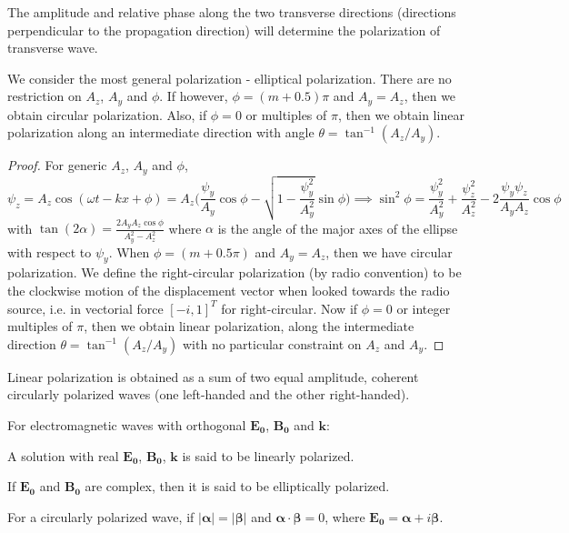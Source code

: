 \documentclass[a4paper]{article}
\begin{document}
\begin{defi}
The amplitude and relative phase along the two transverse directions (directions perpendicular to the propagation direction) will determine the polarization of transverse wave. 
\end{defi}
\begin{thm}
We consider the most general polarization - elliptical polarization. There are no restriction on $A_z$, $A_y$ and $\phi$. If however, $\phi=(m+0.5)\pi$ and $A_y=A_z$, then we obtain circular polarization. Also, if $\phi=0$ or multiples of $\pi$, then we obtain linear polarization along an intermediate direction with angle $\theta=\tan^{-1}(A_z/A_y)$.
\end{thm}
\begin{proof}
For generic $A_z$, $A_y$ and $\phi$,
$$\psi_z=A_z\cos(\omega t-kx+\phi)=A_z\bigg(\frac{\psi_y}{A_y}\cos\phi-\sqrt{1-\frac{\psi_y^2}{A_y^2}}\sin\phi\bigg)\implies\sin^2\phi=\frac{\psi_y^2}{A_y^2}+\frac{\psi_z^2}{A_z^2}-2\frac{\psi_y\psi_z}{A_yA_z}\cos\phi$$
with $\tan(2\alpha)=\frac{2A_yA_z\cos\phi}{A_y^2-A_z^2}$ where $\alpha$ is the angle of the major axes of the ellipse with respect to $\psi_y$. When $\phi=(m+0.5\pi)$ and $A_y=A_z$, then we have circular polarization. We define the right-circular polarization (by radio convention) to be the clockwise motion of the displacement vector when looked towards the radio source, i.e. in vectorial force $[-i,1]^T$ for right-circular. Now if $\phi=0$ or integer multiples of $\pi$, then we obtain linear polarization, along the intermediate direction $\theta=\tan^{-1}(A_z/A_y)$ with no particular constraint on $A_z$ and $A_y$.
\end{proof}
\begin{cor}
Linear polarization is obtained as a sum of two equal amplitude, coherent circularly polarized waves (one left-handed and the other right-handed).
\end{cor}
For electromagnetic waves with orthogonal $\mathbf{E_0}$, $\mathbf{B_0}$ and $\mathbf{k}$:
\begin{defi}
A solution with real $\mathbf{E_0}$, $\mathbf{B_0}$, $\mathbf{k}$ is said to be linearly polarized.
\end{defi}
\begin{defi}
If $\mathbf{E_0}$ and $\mathbf{B_0}$ are complex, then it is said to be elliptically polarized.
\end{defi}
\begin{defi}
For a circularly polarized wave, if $|\boldsymbol{\alpha}| = |\boldsymbol{\beta}|$ and $\boldsymbol{\alpha}\cdot\boldsymbol{\beta}=0$, where $\mathbf{E_0}=\boldsymbol{\alpha}+i\boldsymbol{\beta}$.
\end{defi}
\newpage
\end{document}
